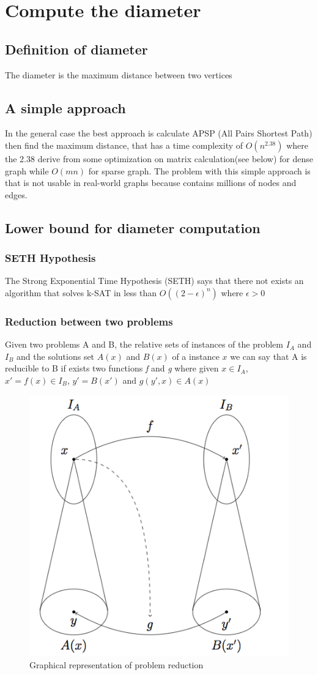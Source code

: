 \chapter{Compute the diameter}
\section{Definition of diameter}
The diameter is the maximum distance between two vertices
\section{A simple approach}
In the general case the best approach is calculate APSP (All Pairs Shortest Path) then find the maximum distance, that has a time complexity of $ O(n^{2.38}) $ where the 2.38 derive from some optimization on matrix calculation(see below) for dense graph while $ O(mn) $ for sparse graph. The problem with this simple approach is that is not usable in real-world graphs because contains millions of nodes and edges.
\section{Lower bound for diameter computation}
\subsection{SETH Hypothesis}
The Strong Exponential Time Hypothesis (SETH) says that there not exists an algorithm that solves k-SAT in less than $ O((2-\epsilon)^n) $ where $ \epsilon > 0 $
\subsection{Reduction between two problems}
Given two problems A and B, the relative sets of instances of the problem $ I_A $ and $ I_B $ and the solutions set $ A(x) $ and $ B(x) $ of a instance $ x $ we can say that A is reducible to B if exists two functions \textit{f} and \textit{g} where given $ x \in I_A $, $ x' = f(x) \in I_B $, $ y' = B(x') $ and $ g(y', x) \in A(x) $

\begin{figure}[H]
	\centering
	\includegraphics[width=0.7\linewidth]{img/problem_reduction}
	\caption{Graphical representation of problem reduction}
	\label{fig:problemreduction}
\end{figure}
